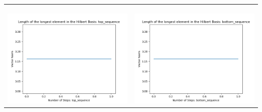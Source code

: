 \documentclass[10pt]{article}
\begin{document}
\begin{tabular}{c|c}
\begin{minipage}{.45\textwidth}
\end{minipage} \\ \\
\hline \\\begin{minipage}{.45\textwidth}
\includegraphics[width=\textwidth]{"DATA/4d/4 generators 2 bound F/top_sequence LENGTH"}
\end{minipage} &
\begin{minipage}{.45\textwidth}
\includegraphics[width=\textwidth]{"DATA/4d/4 generators 2 bound F bottomup/bottom_sequence LENGTH"}
\end{minipage}
\end{tabular}
\end{document}
